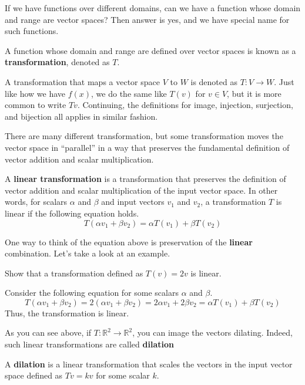 \documentclass[../main.tex]{subfiles}
\begin{document}
If we have functions over different domains, can we have a function
whose domain and range are vector spaces? Then answer is yes, and we
have special name for such functions.

\begin{definition}
A function whose domain and range are defined over vector spaces is
known as a \textbf{transformation}, denoted as $T$.
\end{definition}

A transformation that maps a vector space $V$ to $W$ is denoted as
$T: V \to W$. Just like how we have $f(x)$, we do the same like
$T(v)$ for $v \in V$, but it is more common to write $Tv$.
Continuing, the definitions for image, injection, surjection, and
bijection all applies in similar fashion.

There are many different transformation, but some transformation
moves the vector space in ``parallel'' in a way that preserves
the fundamental definition of vector addition and scalar
multiplication.

\begin{definition}
A \textbf{linear transformation} is a transformation that preserves
the definition of vector addition and scalar multiplication of the
input vector space. In other words, for scalars $\alpha$ and $\beta$
and input vectors $v_1$ and $v_2$, a transformation $T$ is linear
if the following equation holds.
\[
T(\alpha v_1 + \beta v_2)
= \alpha T(v_1) + \beta T(v_2)
\]
\end{definition}

One way to think of the equation above is preservation of the
\textbf{linear} combination. Let's take a look at an example.

\begin{problem}
Show that a transformation defined as $T(v) = 2v$ is linear.
\end{problem}
\begin{solution}
Consider the following equation for some scalars $\alpha$ and $\beta$.
\[
T(\alpha v_1 + \beta v_2)
= 2 (\alpha v_1 + \beta v_2)
= 2 \alpha v_1 + 2 \beta v_2
= \alpha T(v_1) + \beta T(v_2)
\]
Thus, the transformation is linear.
\end{solution}

As you can see above, if $T: \mathbb{R}^2 \to \mathbb{R}^2$, you can
image the vectors dilating. Indeed, such linear transformations are
called \textbf{dilation}

\begin{definition}
A \textbf{dilation} is a linear transformation that scales the vectors
in the input vector space defined as $Tv = kv$ for some scalar $k$.
\end{definition}
\end{document}
